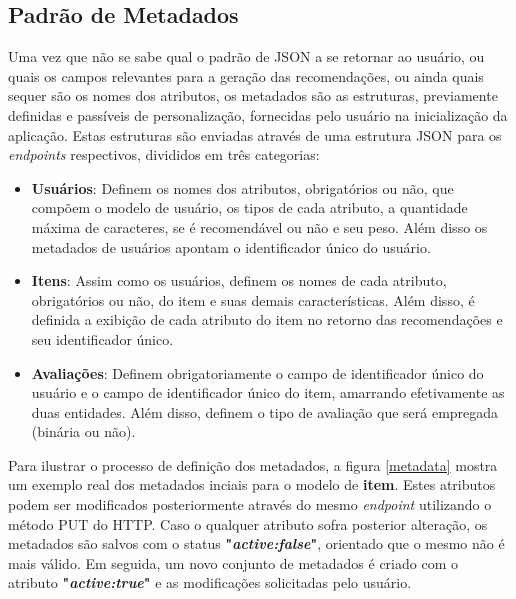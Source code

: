 \documentclass[12pt, openright, oneside, a4paper, brazil]{abntex2}
\begin{document}
\subsection{Padrão de Metadados} \label{analisador:padrao_metadados}

Uma vez que não se sabe qual o padrão de JSON a se retornar ao usuário, ou quais os campos relevantes para a geração das recomendações, ou ainda quais sequer são os nomes dos atributos, os metadados são as estruturas, previamente definidas e passíveis de personalização, fornecidas pelo usuário na inicialização da aplicação. Estas estruturas são enviadas através de uma estrutura JSON para os \textit{endpoints} respectivos, divididos em três categorias:

\begin{itemize}
	
	\item \textbf{Usuários}: Definem os nomes dos atributos, obrigatórios ou não, que compõem o modelo de usuário, os tipos de cada atributo, a quantidade máxima de caracteres, se é recomendável ou não e seu peso. Além disso os metadados de usuários apontam o identificador único do usuário.

	\item \textbf{Itens}: Assim como os usuários, definem os nomes de cada atributo, obrigatórios ou não, do item e suas demais características. Além disso, é definida a exibição de cada atributo do item no retorno das recomendações e seu identificador único.

	\item \textbf{Avaliações}: Definem obrigatoriamente o campo de identificador único do usuário e o campo de identificador único do item, amarrando efetivamente as duas entidades. Além disso, definem o tipo de avaliação que será empregada (binária ou não).

\end{itemize}

Para ilustrar o processo de definição dos metadados, a figura \ref{metadata} mostra um exemplo real dos metadados inciais para o modelo de \textbf{item}. Estes atributos podem ser modificados posteriormente através do mesmo \textit{endpoint} utilizando o método PUT do HTTP. Caso o qualquer atributo sofra posterior alteração, os metadados são salvos com o status \textbf{"\textit{active:false}"}, orientado que o mesmo não é mais válido. Em seguida, um novo conjunto de metadados é criado com o atributo \textbf{"\textit{active:true}"} e as modificações solicitadas pelo usuário.
\end{document}
